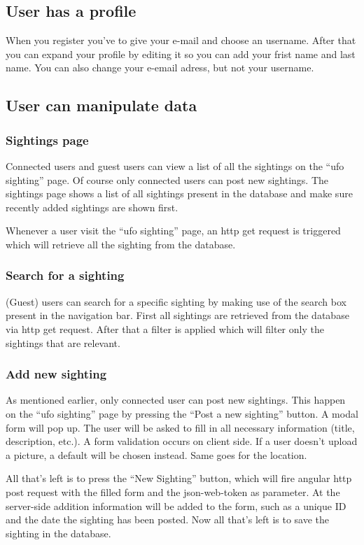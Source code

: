 \documentclass{article}
\begin{document}
\subsection{User has a profile}
When you register you've to give your e-mail and choose an username. After that you can expand your profile by editing it so you can add your frist name and last name. You can also change your e-email adress, but not your username.

\subsection{User can manipulate data}

\subsubsection{Sightings page}
Connected users and guest users can view a list of all the sightings on the “ufo sighting” page. Of course only connected users can post new sightings. The sightings page shows a list of all sightings present in the database and make sure recently added sightings are shown first.

Whenever a user visit the “ufo sighting” page, an http get request is triggered which will retrieve all the sighting from the database.

\subsubsection{Search for a sighting}
(Guest) users can search for a specific sighting by making use of the search box present in the navigation bar. First all sightings are retrieved from the database via http get request. After that a filter is applied which will filter only the sightings that are relevant.

\subsubsection{Add new sighting}
As mentioned earlier, only connected user can post new sightings. This happen on the “ufo sighting” page by pressing the “Post a new sighting” button. A modal form will pop up. The user will be asked to fill in all necessary information (title, description, etc.). A form validation occurs on client side. If a user doesn’t upload a picture, a default will be chosen instead. Same goes for the location. 

All that’s left is to press the “New Sighting” button, which will fire angular http post request with the filled form and the json-web-token as parameter. At the server-side addition information will be added to the form, such as a unique ID and the date the sighting has been posted. Now all that’s left is to save the sighting in the database.
\end{document}
